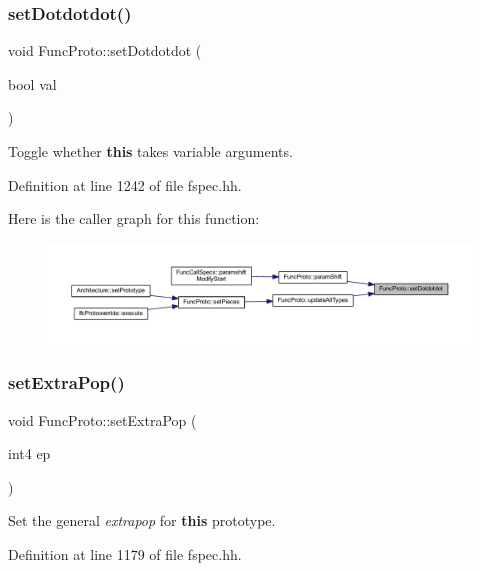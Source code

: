 \subsubsection{\texorpdfstring{setDotdotdot()}{setDotdotdot()}}
{\footnotesize\ttfamily void Func\+Proto\+::set\+Dotdotdot (\begin{DoxyParamCaption}\item[{bool}]{val }\end{DoxyParamCaption})\hspace{0.3cm}{\ttfamily [inline]}}



Toggle whether {\bfseries{this}} takes variable arguments. 



Definition at line 1242 of file fspec.\+hh.

Here is the caller graph for this function\+:
\nopagebreak
\begin{figure}[H]
\begin{center}
\leavevmode
\includegraphics[width=350pt]{class_func_proto_a6d237b521223b740d5d052b68966b556_icgraph}
\end{center}
\end{figure}
\mbox{\label{class_func_proto_af32fa24642ff5423ec167e6f8bca065a}} 
\subsubsection{\texorpdfstring{setExtraPop()}{setExtraPop()}}
{\footnotesize\ttfamily void Func\+Proto\+::set\+Extra\+Pop (\begin{DoxyParamCaption}\item[{int4}]{ep }\end{DoxyParamCaption})\hspace{0.3cm}{\ttfamily [inline]}}



Set the general {\itshape extrapop} for {\bfseries{this}} prototype. 



Definition at line 1179 of file fspec.\+hh.

